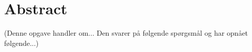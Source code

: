 \documentclass[Main]{subfiles}
\begin{document}
\section*{Abstract}

(Denne opgave handler om... Den svarer på følgende spørgsmål og har opnået følgende...)
\end{document}
